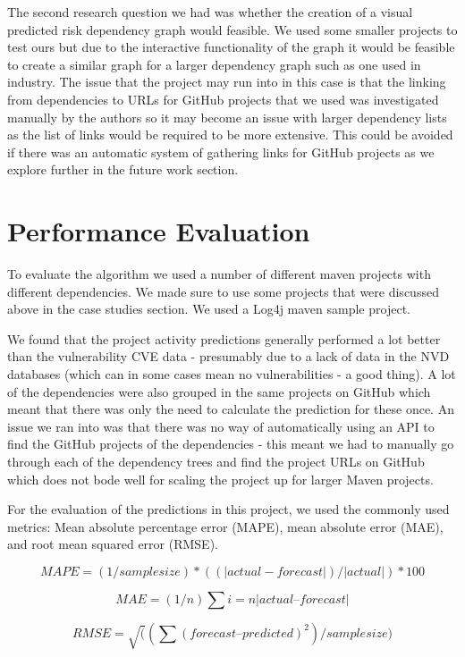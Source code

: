 \documentclass[conference]{IEEEtran}
\begin{document}
The second research question we had was whether the creation of a visual predicted risk dependency graph would feasible. We used some smaller projects to test ours but due to the interactive functionality of the graph it would be feasible to create a similar graph for a larger dependency graph such as one used in industry. The issue that the project may run into in this case is that the linking from dependencies to URLs for GitHub projects that we used was investigated manually by the authors so it may become an issue with larger dependency lists as the list of links would be required to be more extensive. This could be avoided if there was an automatic system of gathering links for GitHub projects as we explore further in the future work section. 

\section{Performance Evaluation}

To evaluate the algorithm we used a number of different maven projects with different dependencies. We made sure to use some projects that were discussed above in the case studies section. We used a Log4j maven sample project. 

We found that the project activity predictions generally performed a lot better than the vulnerability CVE data - presumably due to a lack of data in the NVD databases (which can in some cases mean no vulnerabilities - a good thing). A lot of the dependencies were also grouped in the same projects on GitHub which meant that there was only the need to calculate the prediction for these once. An issue we ran into was that there was no way of automatically using an API to find the GitHub projects of the dependencies - this meant we had to manually go through each of the dependency trees and find the project URLs on GitHub which does not bode well for scaling the project up for larger Maven projects. 

For the evaluation of the predictions in this project, we used the commonly used metrics: Mean absolute percentage error (MAPE), mean absolute error (MAE), and root mean squared error (RMSE). 

\[ MAPE = (1 / sample size) * ( ( |actual - forecast| ) / |actual| ) * 100 \]

\[ MAE = (1/n) \sum{i=n} |actual – forecast|  \]

\[ RMSE = \sqrt( (\sum (forecast – predicted) ^ 2) / sample size )  \]
\end{document}
